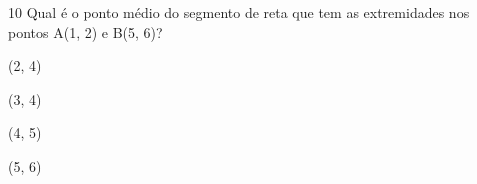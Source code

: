 





\num{10} Qual é o ponto médio do segmento de reta que tem as extremidades nos
pontos A(1, 2) e B(5, 6)?

\begin{multicols}{2}
\begin{escolha}
\item (2, 4)
\item (3, 4)
\item (4, 5)
\item (5, 6)
\end{escolha}
\end{multicols}





